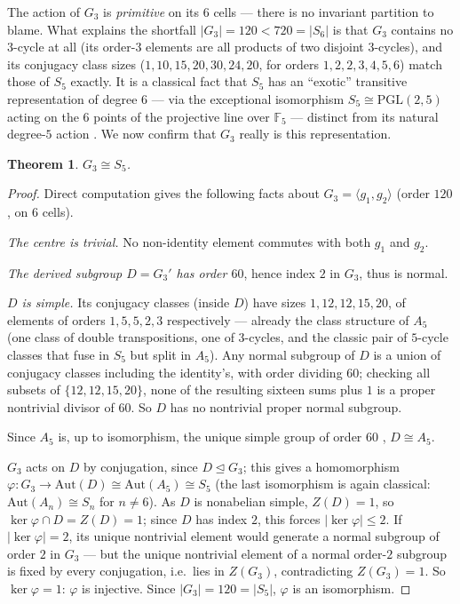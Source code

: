 \documentclass[11pt]{article}
\newtheorem{theorem}{Theorem}
\begin{document}
The action of $G_3$ is \emph{primitive} on its $6$ cells — there is no invariant partition to blame. What explains the shortfall $|G_3| = 120 < 720 = |S_6|$ is that $G_3$ contains no $3$-cycle at all (its order-$3$ elements are all products of two disjoint $3$-cycles), and its conjugacy class sizes ($1,10,15,20,30,24,20$, for orders $1,2,2,3,4,5,6$) match those of $S_5$ exactly. It is a classical fact that $S_5$ has an ``exotic'' transitive representation of degree $6$ — via the exceptional isomorphism $S_5 \cong \mathrm{PGL}(2,5)$ acting on the $6$ points of the projective line over $\mathbb F_5$ — distinct from its natural degree-$5$ action \cite{JanuszRotman1982}. We now confirm that $G_3$ really is this representation.

\begin{theorem}\label{thm:g3iso}
$G_3 \cong S_5$.
\end{theorem}
\begin{proof}
Direct computation gives the following facts about $G_3 = \langle g_1,g_2\rangle$ (order $120$, on $6$ cells).

\emph{The centre is trivial.} No non-identity element commutes with both $g_1$ and $g_2$.

\emph{The derived subgroup $D = G_3'$ has order $60$}, hence index $2$ in $G_3$, thus is normal.

\emph{$D$ is simple.} Its conjugacy classes (inside $D$) have sizes $1,12,12,15,20$, of elements of orders $1,5,5,2,3$ respectively — already the class structure of $A_5$ (one class of double transpositions, one of $3$-cycles, and the classic pair of $5$-cycle classes that fuse in $S_5$ but split in $A_5$). Any normal subgroup of $D$ is a union of conjugacy classes including the identity's, with order dividing $60$; checking all subsets of $\{12,12,15,20\}$, none of the resulting sixteen sums plus $1$ is a proper nontrivial divisor of $60$. So $D$ has no nontrivial proper normal subgroup.

Since $A_5$ is, up to isomorphism, the unique simple group of order $60$ \cite{DummitFoote2004}, $D \cong A_5$.

$G_3$ acts on $D$ by conjugation, since $D \trianglelefteq G_3$; this gives a homomorphism $\varphi\colon G_3 \to \mathrm{Aut}(D) \cong \mathrm{Aut}(A_5) \cong S_5$ (the last isomorphism is again classical: $\mathrm{Aut}(A_n) \cong S_n$ for $n \neq 6$). As $D$ is nonabelian simple, $Z(D)=1$, so $\ker\varphi \cap D = Z(D) = 1$; since $D$ has index $2$, this forces $|\ker\varphi| \le 2$. If $|\ker\varphi|=2$, its unique nontrivial element would generate a normal subgroup of order $2$ in $G_3$ — but the unique nontrivial element of a normal order-$2$ subgroup is fixed by every conjugation, i.e.\ lies in $Z(G_3)$, contradicting $Z(G_3)=1$. So $\ker\varphi = 1$: $\varphi$ is injective. Since $|G_3| = 120 = |S_5|$, $\varphi$ is an isomorphism.
\end{proof}
\end{document}

